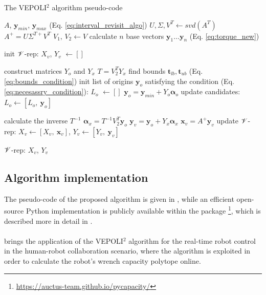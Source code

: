 \begin{algorithm}[!t]
\caption{The VEPOLI$^2$ algorithm pseudo-code}
\begin{algorithmic}
\REQUIRE $A$, $\bm{y}_{min}$, $\bm{y}_{max}$ (Eq. \ref{eq:interval_revisit_algo}) 
\STATE $U, \Sigma, V^T \leftarrow svd(A^T)$ 
\STATE $A^{+} = U\Sigma^{T+}V^T$
\STATE $V_1,\, V_2  \leftarrow V $
\STATE calculate $n$ base vectors $\bm{y}_1 \dotsc \bm{y}_n$ (Eq. \ref{eq:torque_new})

\STATE init $\mathscr{V}$-rep: $X_v$, $Y_v$ $\!\leftarrow\! []$

\STATE construct matrices $Y_o$ and $Y_x$
\STATE $T = V_2^TY_x$
\STATE find bounds $\bm{t}_{lb},\bm{t}_{ub}$ (Eq. \ref{eq:bounds_condition})
\STATE init list of origins $\bm{y}_o$ satisfying the condition (Eq. \ref{eq:necesassry_condition}): $L_o$ $\!\leftarrow\! []$ 
\STATE $\bm{y}_o = \bm{y}_{min} +  Y_o\bm{\alpha}_o$ 
\STATE update candidates: $L_o \!\leftarrow\! [L_o,~ \bm{y}_o]$
\ENDIF
\ENDFOR

\STATE calculate the inverse $T^{-1}$
\STATE $\bm{\alpha}_x = T^{-1}V_2^T\bm{y}_o $
\STATE $\bm{y}_{v} = \bm{y}_o + Y_x\bm{\alpha}_x$ 
\STATE $\bm{x}_{v} = A^{+}\bm{y}_{v}$ 
\STATE update $\mathscr{V}$-rep: ${X}_{v} \!\leftarrow\! [{X}_{v},~ \bm{x}_v ]$, ${Y}_{v} \!\leftarrow\! [{Y}_{v},~ \bm{y}_v ]$ 
\ENDIF
\ENDFOR
\ENDIF


\ENDIF

\ENDFOR
\RETURN $\mathscr{V}$-rep: $X_v$, $Y_v$

\end{algorithmic}
\label{alg:algo_1}
\end{algorithm}

\subsection{Algorithm implementation}
The pseudo-code of the proposed algorithm is given in , while an efficient open-source Python implementation is publicly available within the package \footnote{\href{https://auctus-team.github.io/pycapacity/}{https://auctus-team.github.io/pycapacity/}}, which is described more in detail in .\\\\
 brings the application of the VEPOLI$^2$ algorithm for the real-time robot control in the human-robot collaboration scenario, where the algorithm is exploited in order to calculate the robot's wrench capacity polytope online. 



